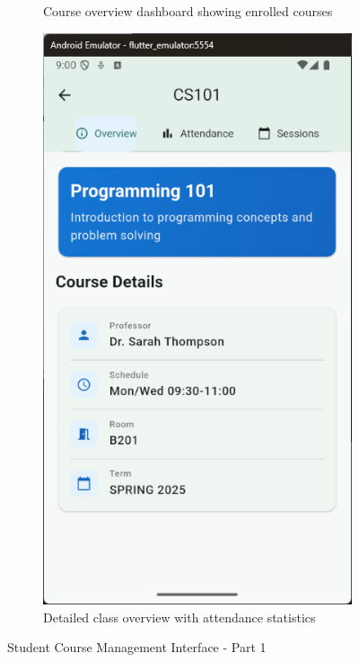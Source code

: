 \begin{figure}[H]
\begin{subfigure}[b]{0.35\textwidth}
        \caption{Course overview dashboard showing enrolled courses}
    \end{subfigure}
    \hfill
    \begin{subfigure}[b]{0.35\textwidth}
        \includegraphics[width=\textwidth]{images/rachid/student-side-courses-home-classOverview-2.png}
        \caption{Detailed class overview with attendance statistics}
    \end{subfigure}
    \caption{Student Course Management Interface - Part 1}
    \label{fig:student-courses-1}
\end{figure}

